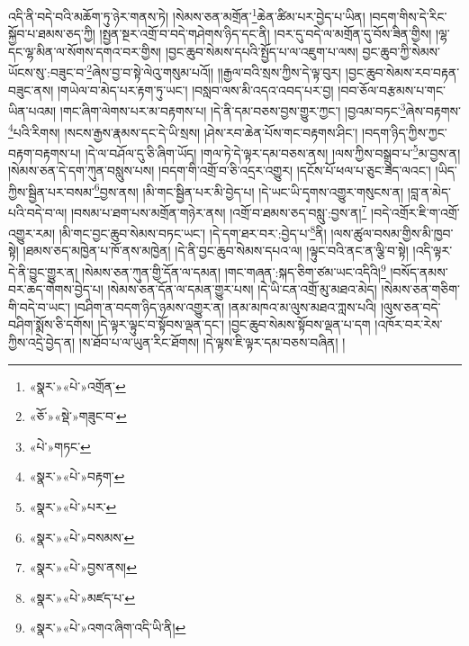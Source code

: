 འདི་ནི་བདེ་བའི་མཆོག་ཏུ་ཉེར་གནས་ཏེ། །སེམས་ཅན་མགྲོན་\footnote{«སྣར་»«པེ་»འགྲོན་}ཆེན་ཚིམ་པར་བྱེད་པ་ཡིན། །བདག་གིས་དེ་རིང་སྐྱོབ་པ་ཐམས་ཅད་ཀྱི། །སྤྱན་སྔར་འགྲོ་བ་བདེ་གཤེགས་ཉིད་དང་ནི། །བར་དུ་བདེ་ལ་མགྲོན་དུ་བོས་ཟིན་གྱིས། །ལྷ་དང་ལྷ་མིན་ལ་སོགས་དགའ་བར་གྱིས། །བྱང་ཆུབ་སེམས་དཔའི་སྤྱོད་པ་ལ་འཇུག་པ་ལས། བྱང་ཆུབ་ཀྱི་སེམས་ཡོངས་སུ་:བཟུང་བ་\footnote{«ཅོ་»«སྡེ་»གཟུང་བ་}ཞེས་བྱ་བ་སྟེ་ལེའུ་གསུམ་པའོ།། །།རྒྱལ་བའི་སྲས་ཀྱིས་དེ་ལྟ་བུར། །བྱང་ཆུབ་སེམས་རབ་བརྟན་བཟུང་ནས། །གཡེལ་བ་མེད་པར་རྟག་ཏུ་ཡང་། །བསླབ་ལས་མི་འདའ་འབད་པར་བྱ། །བབ་ཅོལ་བརྩམས་པ་གང་ཡིན་པའམ། །གང་ཞིག་ལེགས་པར་མ་བརྟགས་པ། །དེ་ནི་དམ་བཅས་བྱས་གྱུར་ཀྱང་། །བྱའམ་བཏང་\footnote{«པེ་»གཏང་}ཞེས་བརྟགས་\footnote{«སྣར་»«པེ་»བརྟག་}པའི་རིགས། །སངས་རྒྱས་རྣམས་དང་དེ་ཡི་སྲས། །ཤེས་རབ་ཆེན་པོས་གང་བརྟགས་ཤིང་། །བདག་ཉིད་ཀྱིས་ཀྱང་བརྟག་བརྟགས་པ། །དེ་ལ་བཤོལ་དུ་ཅི་ཞིག་ཡོད། །གལ་ཏེ་དེ་ལྟར་དམ་བཅས་ནས། །ལས་ཀྱིས་བསྒྲུབ་པ་\footnote{«སྣར་»«པེ་»པར་}མ་བྱས་ན། །སེམས་ཅན་དེ་དག་ཀུན་བསླུས་པས། །བདག་གི་འགྲོ་བ་ཅི་འདྲར་འགྱུར། །དངོས་པོ་ཕལ་པ་ཅུང་ཟད་ལའང་། །ཡིད་ཀྱིས་སྦྱིན་པར་བསམ་\footnote{«སྣར་»«པེ་»བསམས་}བྱས་ནས། །མི་གང་སྦྱིན་པར་མི་བྱེད་པ། །དེ་ཡང་ཡི་དྭགས་འགྱུར་གསུངས་ན། །བླ་ན་མེད་པའི་བདེ་བ་ལ། །བསམ་པ་ཐག་པས་མགྲོན་གཉེར་ནས། །འགྲོ་བ་ཐམས་ཅད་བསླུ་:བྱས་ན།\footnote{«སྣར་»«པེ་»བྱས་ནས།} །བདེ་འགྲོར་ཇི་ག་འགྲོ་འགྱུར་རམ། །མི་གང་བྱང་ཆུབ་སེམས་བཏང་ཡང་། །དེ་དག་ཐར་བར་:བྱེད་པ་\footnote{«སྣར་»«པེ་»མཛད་པ་}ནི། །ལས་ཚུལ་བསམ་གྱིས་མི་ཁྱབ་སྟེ། །ཐམས་ཅད་མཁྱེན་པ་ཁོ་ནས་མཁྱེན། །དེ་ནི་བྱང་ཆུབ་སེམས་དཔའ་ལ། །ལྟུང་བའི་ནང་ན་ལྕི་བ་སྟེ། །འདི་ལྟར་དེ་ནི་བྱུང་གྱུར་ན། །སེམས་ཅན་ཀུན་གྱི་དོན་ལ་དམན། །གང་གཞན་:སྐད་ཅིག་ཙམ་ཡང་འདིའི།\footnote{«སྣར་»«པེ་»འགའ་ཞིག་འདི་ཡི་ནི།} །བསོད་ནམས་བར་ཆད་གེགས་བྱེད་པ། །སེམས་ཅན་དོན་ལ་དམན་གྱུར་པས། །དེ་ཡི་ངན་འགྲོ་མུ་མཐའ་མེད། །སེམས་ཅན་གཅིག་གི་བདེ་བ་ཡང་། །བཤིག་ན་བདག་ཉིད་ཉམས་འགྱུར་ན། །ནམ་མཁའ་མ་ལུས་མཐའ་ཀླས་པའི། །ལུས་ཅན་བདེ་བཤིག་སྨོས་ཅི་དགོས། །དེ་ལྟར་ལྟུང་བ་སྟོབས་ལྡན་དང་། །བྱང་ཆུབ་སེམས་སྟོབས་ལྡན་པ་དག །འཁོར་བར་རེས་ཀྱིས་འདྲེ་བྱེད་ན། །ས་ཐོབ་པ་ལ་ཡུན་རིང་ཐོགས། །དེ་ལྟས་ཇི་ལྟར་དམ་བཅས་བཞིན། །
